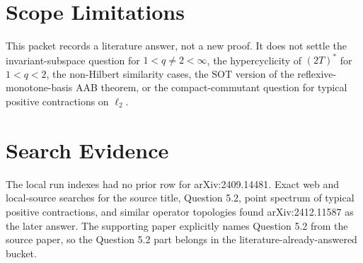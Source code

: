\documentclass[11pt]{article}
\newcommand{\elltwo}{\ell_2}
\newcommand{\SOT}{\mathrm{SOT}}
\begin{document}
\section*{Scope Limitations}

This packet records a literature answer, not a new proof.  It does not settle
the invariant-subspace question for $1<q\ne 2<\infty$, the hypercyclicity of
$(2T)^*$ for $1<q<2$, the non-Hilbert similarity cases, the $\SOT$ version of
the reflexive-monotone-basis AAB theorem, or the compact-commutant question for
typical positive contractions on $\elltwo$.

\section*{Search Evidence}

The local run indexes had no prior row for arXiv:2409.14481.  Exact web and
local-source searches for the source title, Question 5.2, point spectrum of
typical positive contractions, and similar operator topologies found
arXiv:2412.11587 as the later answer.  The supporting paper explicitly names
Question 5.2 from the source paper, so the Question 5.2 part belongs in
the literature-already-answered bucket.
\end{document}
